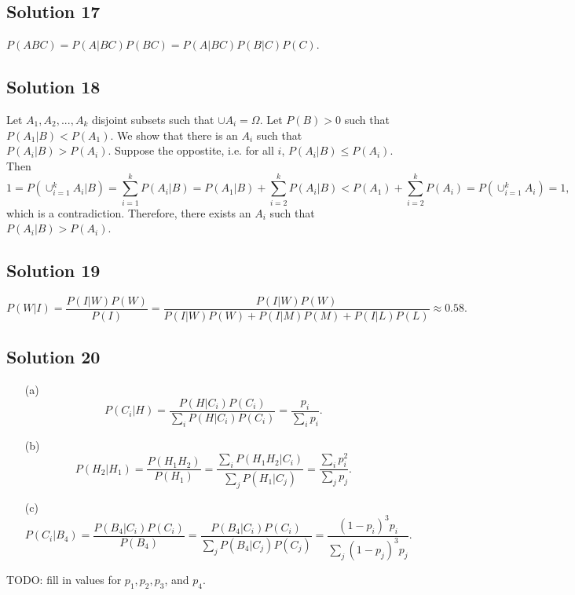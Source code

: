 \subsection*{Solution 17}

$P(ABC) = P(A|BC) P(BC) = P(A|BC) P(B|C) P(C)$.


\subsection*{Solution 18}

Let $A_1, A_2, ..., A_k$ disjoint subsets such that $\cup A_i = \Omega$.
Let $P(B) > 0$ such that $P(A_1|B) < P(A_1)$.
We show that there is an $A_i$ such that $P(A_i|B) > P(A_i)$.
Suppose the oppostite, i.e. for all $i$, $P(A_i|B) \leq P(A_i)$.
Then
\begin{equation*}
    1 = P(\cup_{i = 1}^k A_i|B)
        = \sum_{i = 1}^k P(A_i | B)
        = P(A_1 | B) + \sum_{i = 2}^k P(A_i | B)
        < P(A_1) + \sum_{i = 2}^k P(A_i)
        = P(\cup_{i = 1}^k A_i)
        = 1,
\end{equation*}
which is a contradiction.
Therefore, there exists an $A_i$ such that $P(A_i|B) > P(A_i)$.


\subsection*{Solution 19}

\begin{equation*}
    P(W|I) = \frac{P(I|W)P(W)}{P(I)}
        = \frac{P(I|W)P(W)}{P(I|W)P(W) + P(I|M)P(M) + P(I|L)P(L)}
        \approx 0.58.
\end{equation*}


\subsection*{Solution 20}

\begin{itemize}
    \item[(a)] \begin{equation*}
            P(C_i | H) = \frac{P(H|C_i)P(C_i)}{\sum_i P(H|C_i)P(C_i)}
                = \frac{p_i}{\sum_i p_i}.
        \end{equation*}
    \item[(b)] \begin{equation*}
            P(H_2 | H_1)
                = \frac{P(H_1 H_2)}{P(H_1)}
                = \frac{\sum_i P(H_1 H_2 | C_i)}{\sum_j P(H_1 | C_j)}
                = \frac{\sum_i p_i^2}{\sum_j p_j}.
        \end{equation*}
    \item[(c)] \begin{equation*}
            P(C_i | B_4)
                = \frac{P(B_4 | C_i)P(C_i)}{P(B_4)}
                = \frac{P(B_4 | C_i)P(C_i)}{\sum_j P(B_4 | C_j) P(C_j)}
                = \frac{(1 - p_i)^3 p_i}{\sum_j (1 - p_j)^3 p_j}.
        \end{equation*}
\end{itemize}
TODO: fill in values for $p_1, p_2, p_3$, and $p_4$.
